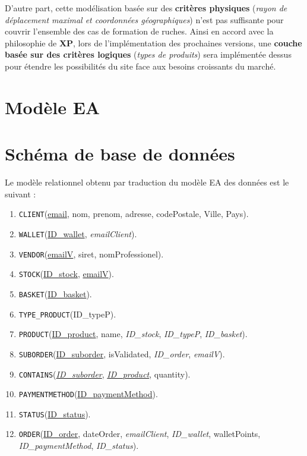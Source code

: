 \documentclass[a4paper,12pt]{book}
\theoremstyle{break}
\theoremstyle{break}
\theoremstyle{break}
\theoremstyle{break}
\theoremstyle{definition}
\theoremstyle{remark}
\begin{document}
D'autre part, cette modélisation basée sur des \textbf{critères physiques} (\textit{rayon de déplacement maximal et coordonnées géographiques}) n'est pas suffisante pour couvrir l'ensemble des cas de formation de ruches. Ainsi en accord avec la philosophie de \textbf{XP}, lors de l'implémentation des prochaines versions, une \textbf{couche basée sur des critères logiques} (\textit{types de produits}) sera implémentée dessus pour étendre les possibilités du site face aux besoins croissants du marché.
\section{Modèle EA}

\section{Schéma de base de données}
Le modèle relationnel obtenu par traduction du modèle EA des données est le suivant :
\begin{enumerate}
  \item{\texttt{CLIENT}(\underline{email}, nom, prenom, adresse, codePostale, Ville, Pays).}
  \item{\texttt{WALLET}(\underline{ID\_wallet}, \textit{emailClient}).}
  \item{\texttt{VENDOR}(\underline{emailV}, siret, nomProfessionel).}
  \item{\texttt{STOCK}(\underline{ID\_stock}, \underline{emailV}).}
  \item{\texttt{BASKET}(\underline{ID\_basket}).}
  \item{\texttt{TYPE\_PRODUCT}(ID\_typeP).}
  \item{\texttt{PRODUCT}(\underline{ID\_product}, name, \textit{ID\_stock}, \textit{ID\_typeP}, \textit{ID\_basket}).}
  \item{\texttt{SUBORDER}(\underline{ID\_suborder}, isValidated, \textit{ID\_order}, \textit{emailV}).}
  \item{\texttt{CONTAINS}(\underline{\textit{ID\_suborder}}, \underline{\textit{ID\_product}}, quantity).}
  \item{\texttt{PAYMENTMETHOD}(\underline{ID\_paymentMethod}).}
  \item{\texttt{STATUS}(\underline{ID\_status}).}
  \item{\texttt{ORDER}(\underline{ID\_order}, dateOrder, \textit{emailClient}, \textit{ID\_wallet}, walletPoints, \textit{ID\_paymentMethod}, \textit{ID\_status}).}
\end{enumerate}
\end{document}
